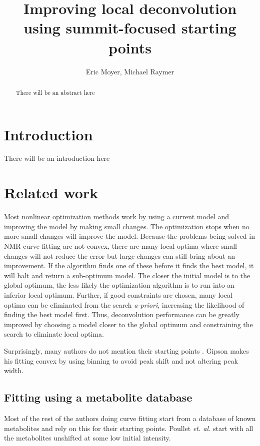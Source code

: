 \documentclass[10pt,letterpaper]{article}
\author{Eric Moyer, Michael Raymer}
\title{Improving local deconvolution using summit-focused starting points}
\begin{document}
\maketitle

\begin{abstract}
There will be an abstract here
\end{abstract}

\section{Introduction}
There will be an introduction here
\section{Related work}
Most nonlinear optimization methods work by using a current model and improving the model by making small changes.
The optimization stops when no more small changes will improve the model. Because the problems being solved in
NMR curve fitting are not convex, there are many local optima where small changes will not reduce the error but 
large changes can still bring about an improvement. If the algorithm finds one of these before it finds the best
model, it will halt and return a sub-optimum model. The closer the initial model is to the global optimum, 
the less likely the optimization algorithm is to run into an inferior local optimum. Further, if good constraints
are chosen, many local optima can be eliminated from the search \textit{a-priori}, increasing the likelihood
of finding the best model first. Thus, deconvolution performance can be greatly improved by choosing a model 
closer to the global optimum and constraining the search to eliminate local optima.

Surprisingly, many authors do not mention their starting points \cite{Martin1994,Romano2002,Vanhamme2000}. 
Gipson\cite{Gipson2006} makes his fitting convex by using binning to avoid peak shift and not altering peak
width.

\subsection{Fitting using a metabolite database}

Most of the rest of the authors doing curve fitting start from a database of known metabolites and
rely on this for their starting points. Poullet \textit{et. al.} start with all the metabolites unshifted at 
some low initial intensity.\cite{Poullet2007} 
\end{document}
